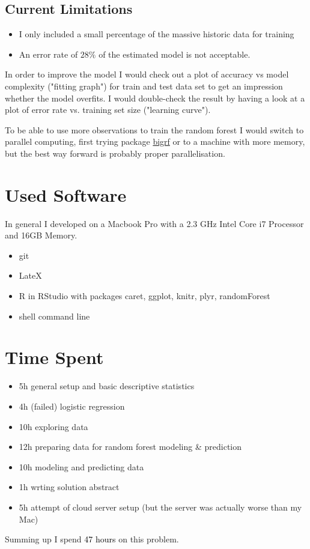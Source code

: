 \documentclass{article}\usepackage[]{graphicx}\usepackage[]{color}
\begin{document}

\subsection{Current Limitations} %
\label{sub:current_limitations}

\begin{itemize}
	\item I only included a small percentage of the massive historic data for training 
	\item An error rate of $28\%$ of the estimated model is not acceptable.
\end{itemize}

In order to improve the model I would check out a plot of accuracy vs model complexity ("fitting graph") for train and test data set to get an impression whether the model overfits. I would double-check the result by having a look at a plot of error rate vs. training set size ("learning curve").

To be able to use more observations to train the random forest I would switch to parallel computing, first trying package \href{http://cran.r-project.org/web/packages/bigrf/index.html}{bigrf} or to a machine with more memory, but the best way forward is probably proper parallelisation.




\section{Used Software}
\label{used_software}
In general I developed on a Macbook Pro with a 2.3 GHz Intel Core i7 Processor and 16GB Memory.

\begin{itemize}
	\item git
	\item LateX
	\item R in RStudio with packages caret, ggplot, knitr, plyr, randomForest
	\item shell command line
\end{itemize}

\section{Time Spent}
\begin{itemize}
	\item 5h general setup and basic descriptive statistics
	\item 4h (failed) logistic regression
	\item 10h exploring data
	\item 12h preparing data for random forest modeling \& prediction
	\item 10h modeling and predicting data
	\item 1h wrting solution abstract 
	\item 5h attempt of cloud server setup (but the server was actually worse than my Mac)
\end{itemize}

Summing up I spend \textcolor{black}{47 hours} on this problem.
\end{document}
